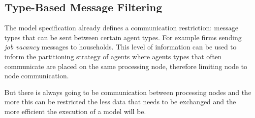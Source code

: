 \documentclass{aamas2009}
\begin{document}
\subsection{Type-Based Message Filtering}

The model specification already defines a communication restriction: message
types that can be sent between certain agent types. For example firms sending
\textit{job vacancy} messages to households.
This level of information can be used to inform the partitioning strategy of
agents where agents types that often communicate are placed on the same
processing node, therefore limiting node to node communication.

But there is always going to be communication between processing nodes and the
more this can be restricted the less data that needs to be exchanged and the
more efficient the execution of a model will be.





% 

% 
% 
% 
\end{document}
